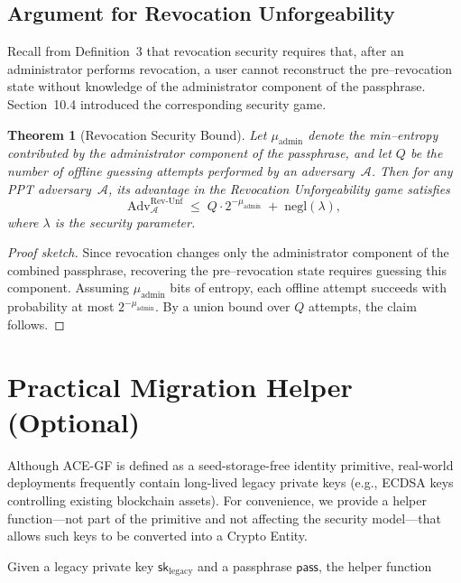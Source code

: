 \documentclass[12pt,a4paper]{article}
\newtheorem{theorem}{Theorem}[section]
\begin{document}
\subsection{Argument for Revocation Unforgeability}

Recall from Definition~3 that revocation security requires that,
after an administrator performs revocation, a user cannot reconstruct
the pre--revocation state without knowledge of the administrator
component of the passphrase.  Section~10.4 introduced the corresponding security game.

\begin{theorem}[Revocation Security Bound]\label{thm:revocation}
Let $\mu_{\text{admin}}$ denote the min--entropy contributed by the
administrator component of the passphrase, and let $Q$ be the number of
offline guessing attempts performed by an adversary~$\mathcal{A}$.
Then for any PPT adversary~$\mathcal{A}$,
its advantage in the Revocation Unforgeability game satisfies
\[
   \mathrm{Adv}^{\mathrm{Rev\text{-}Unf}}_{\mathcal{A}}
   \;\le\;
   Q \cdot 2^{-\mu_{\text{admin}}}
   \;+\;
   \mathrm{negl}(\lambda),
\]
where $\lambda$ is the security parameter.
\end{theorem}

\begin{proof}[Proof sketch]
Since revocation changes only the administrator component of the
combined passphrase, recovering the pre--revocation state requires
guessing this component.  Assuming $\mu_{\text{admin}}$ bits of entropy,
each offline attempt succeeds with probability at most $2^{-\mu_{\text{admin}}}$.
By a union bound over $Q$ attempts, the claim follows.
\end{proof}

  \section{Practical Migration Helper (Optional)}

  Although ACE-GF is defined as a seed-storage-free identity primitive,
  real-world deployments frequently contain long-lived legacy private keys
  (e.g., ECDSA keys controlling existing blockchain assets).
  For convenience, we provide a helper function---not part of the primitive
  and not affecting the security model---that allows such keys to be converted into a Crypto Entity.

  Given a legacy private key $\mathsf{sk}_{\mathrm{legacy}}$ and a passphrase
  $\mathsf{pass}$, the helper function
\end{document}
